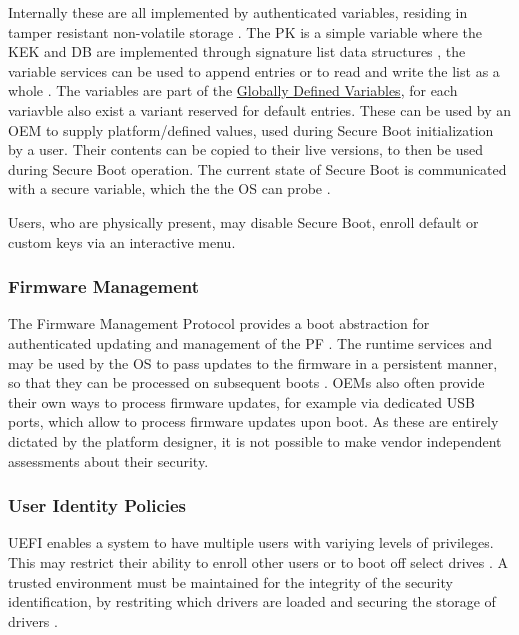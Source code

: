 Internally these are all implemented by authenticated variables, residing in tamper resistant non-volatile storage \cite[Section 32.3]{uefi-spec}.
The \ac{PK} is a simple variable where the \ac{KEK} and \ac{DB} are implemented through signature list data structures \cite[Section 32.4.1]{uefi-spec}, the variable services can be used to append entries or to read and write the list as a whole \cite[Sections 32.3.5 and 32.5.3]{uefi-spec}.
The variables are part of the \hyperref[sec:uefi-pi:uefi:variables]{Globally Defined Variables}, for each variavble also exist a variant reserved for default entries.
These can be used by an \ac{OEM} to supply platform\-/defined values, used during Secure Boot initialization by a user.
Their contents can be copied to their live versions, to then be used during Secure Boot operation.
The current state of Secure Boot is communicated with a secure variable, which the the \ac{OS} can probe \cite[Section 3.3]{uefi-spec}.

Users, who are physically present, may disable Secure Boot, enroll default or custom keys via an interactive menu. 

\subsubsection{Firmware Management}

The Firmware Management Protocol provides a boot abstraction for authenticated updating and management of the \ac{PF} \cite[Section 23]{uefi-spec}.
The runtime services  and  may be used by the \ac{OS} to pass updates to the firmware in a persistent manner, so that they can be processed on subsequent boots \cite[Section 23.3]{uefi-spec}.
\acp{OEM} also often provide their own ways to process firmware updates, for example via dedicated \ac{USB} ports, which allow to process firmware updates upon boot.
As these are entirely dictated by the platform designer, it is not possible to make vendor independent assessments about their security.

\subsubsection{User Identity Policies}

\ac{UEFI} enables a system to have multiple users with variying levels of privileges.
This may restrict their ability to enroll other users or to boot off select drives \cite[Section 36.1.2]{uefi-spec}.
A trusted environment must be maintained for the integrity of the security identification, by restriting which drivers are loaded and securing the storage of drivers \cite[Section 36.1.4]{uefi-spec}.